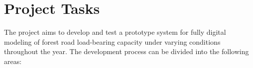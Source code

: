 \section{Project Tasks}
The project aims to develop and test a prototype system for fully digital modeling of forest road load-bearing capacity under varying conditions throughout the year. The development process can be divided into the following areas:

